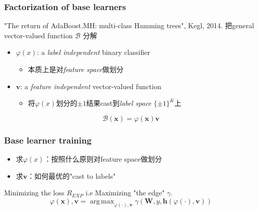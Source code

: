 \documentclass{beamer}
\DeclareMathOperator*{\argmax}{arg\,max}
\begin{document}
\begin{frame}
\frametitle{Factorization of base learners}

{\color{purple} "The return of AdaBoost.MH: multi-class Hamming trees", Kegl, 2014.}
把general vector-valued function $\mathcal{B}$ 分解
\begin{itemize}
\item $\varphi(x)$: a \textit{label independent} binary classifier 
  \begin{itemize}
    \item 本质上是对\textit{feature space}做划分
  \end{itemize}
\item $\mathbf{v}$: a \textit{feature independent} vector-valued function
  \begin{itemize}
    \item 将$\varphi(x)$划分的${\pm 1}$结果cast到\textit{label space} $\{\pm 1\}^K$上
  \end{itemize}
\end{itemize}
\begin{block}{}
$$\mathcal{B}(\mathbf{x}) = \varphi(\mathbf{x}) \mathbf{v}$$
\end{block}
\end{frame}

\begin{frame}
\frametitle{Base learner training}
\begin{itemize}
\item 求$\varphi(x)$：按照什么原则对feature space做划分
\item 求$\mathbf{v}$：如何最优的"cast to labels"
\end{itemize}

\pause

\begin{block}{ }
Minimizing the loss $R_{EXP}$ i.e Maximizing "the edge" $\gamma$.
 $$\varphi(\mathbf{x}), \mathbf{v} = \argmax_{\varphi(\cdot), \mathbf{v}} \gamma(\mathbf{W}, y, \mathbf{h}(\varphi(\cdot), \mathbf{v}))$$
\end{block}
\end{frame}
\end{document}
